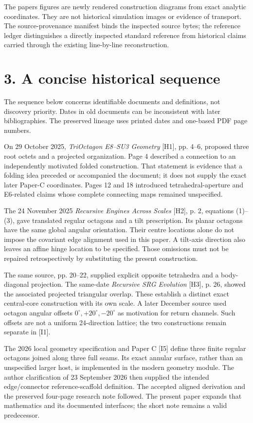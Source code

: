 \documentclass[
  11pt,
  a4paper,
]{article}
\begin{document}
The paper\textquotesingle s figures are newly rendered construction diagrams from exact analytic coordinates. They are not historical simulation images or evidence of transport. The source-provenance manifest binds the inspected source bytes; the reference ledger distinguishes a directly inspected standard reference from historical claims carried through the existing line-by-line reconstruction.

\section{3. A concise historical sequence}\label{a-concise-historical-sequence}

The sequence below concerns identifiable documents and definitions, not discovery priority. Dates in old documents can be inconsistent with later bibliographies. The preserved lineage uses printed dates and one-based PDF page numbers.

On 29 October 2025, \emph{TriOctagon E8--SU3 Geometry} {[}H1{]}, pp. 4--6, proposed three root octets and a projected organization. Page 4 described a connection to an independently motivated folded construction. That statement is evidence that a folding idea preceded or accompanied the document; it does not supply the exact later Paper-C coordinates. Pages 12 and 18 introduced tetrahedral-aperture and E6-related claims whose complete connecting maps remained unspecified.

The 24 November 2025 \emph{Recursive Engines Across Scales} {[}H2{]}, p. 2, equations (1)--(3), gave translated regular octagons and a tilt prescription. Its planar octagons have the same global angular orientation. Their centre locations alone do not impose the covariant edge alignment used in this paper. A tilt-axis direction also leaves an affine hinge location to be specified. Those omissions must not be repaired retrospectively by substituting the present construction.

The same source, pp. 20--22, supplied explicit opposite tetrahedra and a body-diagonal projection. The same-date \emph{Recursive SRG Evolution} {[}H3{]}, p. 26, showed the associated projected triangular overlap. These establish a distinct exact central-core construction with its own scale. A later December source used octagon angular offsets \(0^\circ,+20^\circ,-20^\circ\) as motivation for return channels. Such offsets are not a uniform 24-direction lattice; the two constructions remain separate in {[}I1{]}.

The 2026 local geometry specification and Paper C {[}I5{]} define three finite regular octagons joined along three full seams. Its exact annular surface, rather than an unspecified larger host, is implemented in the modern geometry module. The author clarification of 23 September 2026 then supplied the intended edge/connector reference-scaffold definition. The accepted aligned derivation and the preserved four-page research note followed. The present paper expands that mathematics and its documented interfaces; the short note remains a valid predecessor.
\end{document}
